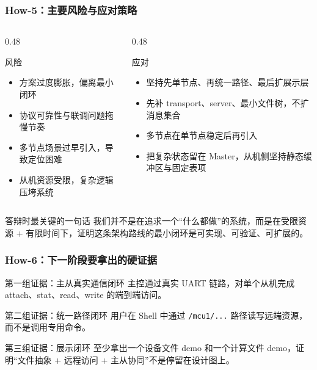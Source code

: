 \documentclass[aspectratio=169]{ctexbeamer}
\begin{document}
\begin{frame}
  \frametitle{How-5：主要风险与应对策略}
  \begin{columns}[T]
    \begin{column}{0.48\textwidth}
      \begin{block}{风险}
        \small
        \begin{itemize}
          \item 方案过度膨胀，偏离最小闭环
          \item 协议可靠性与联调问题拖慢节奏
          \item 多节点场景过早引入，导致定位困难
          \item 从机资源受限，复杂逻辑压垮系统
        \end{itemize}
      \end{block}
    \end{column}
    \begin{column}{0.48\textwidth}
      \begin{block}{应对}
        \small
        \begin{itemize}
          \item 坚持先单节点、再统一路径、最后扩展示层
          \item 先补 transport、server、最小文件树，不扩消息集合
          \item 多节点在单节点稳定后再引入
          \item 把复杂状态留在 Master，从机侧坚持静态缓冲区与固定表项
        \end{itemize}
      \end{block}
    \end{column}
  \end{columns}
  \vspace{0.2cm}
  \begin{alertblock}{答辩时最关键的一句话}
    \small
    我们并不是在追求一个“什么都做”的系统，而是在\alert{受限资源 + 有限时间}下，证明这条架构路线的最小闭环是可实现、可验证、可扩展的。
  \end{alertblock}
\end{frame}

\begin{frame}
  \frametitle{How-6：下一阶段要拿出的硬证据}
  \begin{block}{第一组证据：主从真实通信闭环}
    \small
    主控通过真实 UART 链路，对单个从机完成 attach、stat、read、write 的端到端访问。
  \end{block}
  \pause
  \begin{block}{第二组证据：统一路径闭环}
    \small
    用户在 Shell 中通过 \texttt{/mcu1/...} 路径读写远端资源，而不是调用专用命令。
  \end{block}
  \pause
  \begin{block}{第三组证据：展示闭环}
    \small
    至少拿出一个设备文件 demo 和一个计算文件 demo，证明“文件抽象 + 远程访问 + 主从协同”不是停留在设计图上。
  \end{block}
\end{frame}
\end{document}
